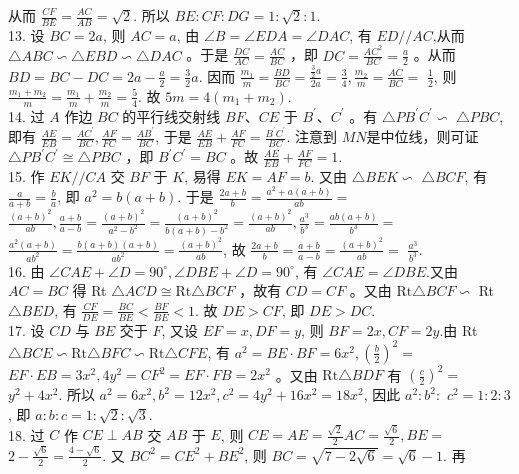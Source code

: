 \documentclass[10pt]{article}
\begin{document}
从而 $\frac{C F}{B E}=\frac{A C}{A B}=\sqrt{2}$. 所以 $B E: C F: D G=1: \sqrt{2}: 1$.\\
13. 设 $B C=2 a$, 则 $A C=a$, 由 $\angle B=\angle E D A=\angle D A C$, 有 $E D / / A C$,从而 $\triangle A B C \backsim \triangle E B D \backsim \triangle D A C$ 。于是 $\frac{D C}{A C}=\frac{A C}{B C}$ ，即 $D C=\frac{A C^{2}}{B C}=\frac{a}{2}$ 。从而 $B D=B C-D C=2 a-\frac{a}{2}=\frac{3}{2} a$. 因而 $\frac{m_{1}}{m}=\frac{B D}{B C}=\frac{\frac{3}{2} a}{2 a}=\frac{3}{4}, \frac{m_{2}}{m}=\frac{A C}{B C}=$ $\frac{1}{2}$, 则 $\frac{m_{1}+m_{2}}{m}=\frac{m_{1}}{m}+\frac{m_{2}}{m}=\frac{5}{4}$. 故 $5 m=4\left(m_{1}+m_{2}\right)$.\\
14. 过 $A$ 作边 $B C$ 的平行线交射线 $B F 、 C E$ 于 $B^{\prime} 、 C^{\prime}$ 。有 $\triangle P B^{\prime} C^{\prime} \backsim$ $\triangle P B C$, 即有 $\frac{A E}{E B}=\frac{A C^{\prime}}{B C}, \frac{A F}{F C}=\frac{A B^{\prime}}{B C}$, 于是 $\frac{A E}{E B}+\frac{A F}{F C}=\frac{B^{\prime} C^{\prime}}{B C}$. 注意到 $M N$是中位线，则可证 $\triangle P B^{\prime} C^{\prime} \cong \triangle P B C$ ，即 $B^{\prime} C^{\prime}=B C$ 。故 $\frac{A E}{E B}+\frac{A F}{F C}=1$.\\
15. 作 $E K / / C A$ 交 $B F$ 于 $K$, 易得 $E K=A F=b$. 又由 $\triangle B E K \backsim$ $\triangle B C F$, 有 $\frac{a}{a+b}=\frac{b}{a}$, 即 $a^{2}=b(a+b)$. 于是 $\frac{2 a+b}{b}=\frac{a^{2}+a(a+b)}{a b}=$ $\frac{(a+b)^{2}}{a b}, \frac{a+b}{a-b}=\frac{(a+b)^{2}}{a^{2}-b^{2}}=\frac{(a+b)^{2}}{b(a+b)-b^{2}}=\frac{(a+b)^{2}}{a b}, \frac{a^{3}}{b^{3}}=\frac{a b(a+b)}{b^{3}}=$ $\frac{a^{2}(a+b)}{a b^{2}}=\frac{b(a+b)(a+b)}{a b^{2}}=\frac{(a+b)^{2}}{a b}$, 故 $\frac{2 a+b}{b}=\frac{a+b}{a-b}=\frac{(a+b)^{2}}{a b}=$ $\frac{a^{3}}{b^{3}}$.\\
16. 由 $\angle C A E+\angle D=90^{\circ}, \angle D B E+\angle D=90^{\circ}$, 有 $\angle C A E=\angle D B E$.又由 $A C=B C$ 得 Rt $\triangle A C D \cong \mathrm{Rt} \triangle B C F$ ，故有 $C D=C F$ 。又由 $\mathrm{Rt} \triangle B C F \backsim$ Rt $\triangle B E D$, 有 $\frac{C F}{D E}=\frac{B C}{B E}<\frac{B F}{B E}<1$. 故 $D E>C F$, 即 $D E>D C$.\\
17. 设 $C D$ 与 $B E$ 交于 $F$, 又设 $E F=x, D F=y$, 则 $B F=2 x, C F=2 y$.由 Rt $\triangle B C E \backsim \mathrm{Rt} \triangle B F C \backsim \mathrm{Rt} \triangle C F E$, 有 $a^{2}=B E \cdot B F=6 x^{2},\left(\frac{b}{2}\right)^{2}=$ $E F \cdot E B=3 x^{2}, 4 y^{2}=C F^{2}=E F \cdot F B=2 x^{2}$ 。又由 $\mathrm{Rt} \triangle B D F$ 有 $\left(\frac{c}{2}\right)^{2}=$ $y^{2}+4 x^{2}$. 所以 $a^{2}=6 x^{2}, b^{2}=12 x^{2}, c^{2}=4 y^{2}+16 x^{2}=18 x^{2}$, 因此 $a^{2}: b^{2}:$ $c^{2}=1: 2: 3$, 即 $a: b: c=1: \sqrt{2}: \sqrt{3}$.\\
18. 过 $C$ 作 $C E \perp A B$ 交 $A B$ 于 $E$, 则 $C E=A E=\frac{\sqrt{2}}{2} A C=\frac{\sqrt{6}}{2}, B E=$ $2-\frac{\sqrt{6}}{2}=\frac{4-\sqrt{6}}{2}$. 又 $B C^{2}=C E^{2}+B E^{2}$, 则 $B C=\sqrt{7-2 \sqrt{6}}=\sqrt{6}-1$. 再
\end{document}
